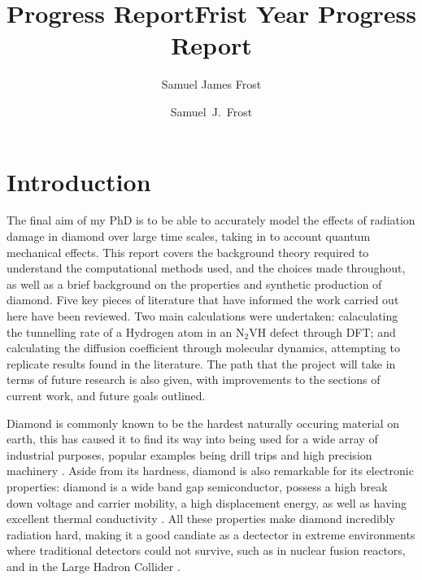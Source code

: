 \documentclass[10pt,a4paper,twocolumn,twoside]{extarticle}
\title{Progress Report}
\author{Samuel James Frost}
\title{Frist Year Progress Report}
\author{Samuel~J.~Frost}
\newcommand{\ntvh}{N$_2$VH}
\begin{document}
	\thispagestyle{empty}
	\tableofcontents

	
\section{Introduction}

The final aim of my PhD is to be able to accurately model the effects of radiation damage in diamond over large time scales, taking in to account quantum mechanical effects. This report covers the background theory required to understand the computational methods used, and the choices made throughout, as well as a brief background on the properties and synthetic production of diamond. Five key pieces of literature that have informed the work carried out here have been reviewed. Two main calculations were undertaken: calaculating the tunnelling rate of a Hydrogen atom in an {\ntvh} defect through DFT; and calculating the diffusion coefficient through molecular dynamics, attempting to replicate results found in the literature. The path that the project will take in terms of future research is also given, with improvements to the sections of current work, and future goals outlined.

Diamond is commonly known to be the hardest naturally occuring material on earth, this has caused it to find its way into being used for a wide array of industrial purposes, popular examples being drill trips and high precision machinery \cite{DiamondHardness}. Aside from its hardness, diamond is also remarkable for its electronic properties: diamond is a wide band gap semiconductor, possess a high break down voltage and carrier mobility, a high displacement energy, as well as having excellent thermal conductivity \cite{DiamondElectronic}. All these properties make diamond incredibly radiation hard, making it a good candiate as a dectector in extreme environments where traditional detectors could not survive, such as in nuclear fusion reactors, and in the Large Hadron Collider \cite{DiamondSensor}. 
\end{document}
